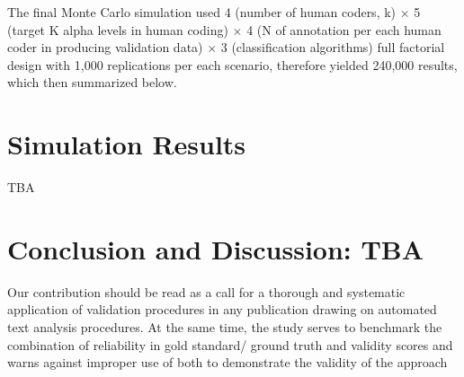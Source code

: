 \documentclass[man, 12pt, a4paper, nolmodern, noextraspace]{apa6}
\begin{document}
    The final Monte Carlo simulation used 4 (number of human coders, k) $\times$ 5 (target K alpha levels in human coding) $\times$ 4 (N of annotation per each human coder in producing validation data) $\times$ 3 (classification algorithms) full factorial design with 1,000 replications per each scenario, therefore yielded 240,000 results, which then summarized below.
    
\section{Simulation Results}

TBA

\section{Conclusion and Discussion: TBA}

    Our contribution should be read as a call for a thorough and systematic application of validation procedures in any publication drawing on automated text analysis procedures. At the same time, the study serves to benchmark the combination of reliability in gold standard/ ground truth and validity scores and warns against improper use of both to demonstrate the validity of the approach
    
\printbibliography
\end{document}
